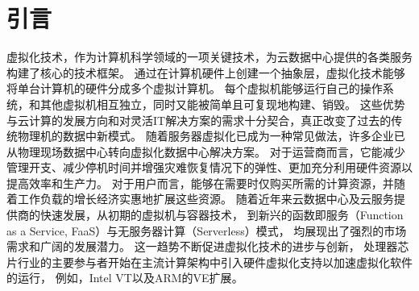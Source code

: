 \chapter{引言}






虚拟化技术，作为计算机科学领域的一项关键技术，为云数据中心提供的各类服务构建了核心的技术框架。
通过在计算机硬件上创建一个抽象层，虚拟化技术能够将单台计算机的硬件分成多个虚拟计算机。
每个虚拟机能够运行自己的操作系统，和其他虚拟机相互独立，同时又能被简单且可复现地构建、销毁。
这些优势与云计算的发展方向和对灵活IT解决方案的需求十分契合，真正改变了过去的传统物理机的数据中新模式。
随着服务器虚拟化已成为一种常见做法，许多企业已从物理现场数据中心转向虚拟化数据中心解决方案。
对于运营商而言，它能减少管理开支、减少停机时间并增强灾难恢复情况下的弹性、更加充分利用硬件资源以提高效率和生产力。
对于用户而言，能够在需要时仅购买所需的计算资源，并随着工作负载的增长经济实惠地扩展这些资源。
随着近年来云数据中心及云服务提供商的快速发展，从初期的虚拟机与容器技术，
到新兴的函数即服务（Function as a Service, FaaS）与无服务器计算（Serverless）模式，
均展现出了强烈的市场需求和广阔的发展潜力。
这一趋势不断促进虚拟化技术的进步与创新，
处理器芯片行业的主要参与者开始在主流计算架构中引入硬件虚拟化支持以加速虚拟化软件的运行，
例如，Intel VT\cite{intel-VT2005Computer}以及ARM的VE扩展\cite{armve2018}。

